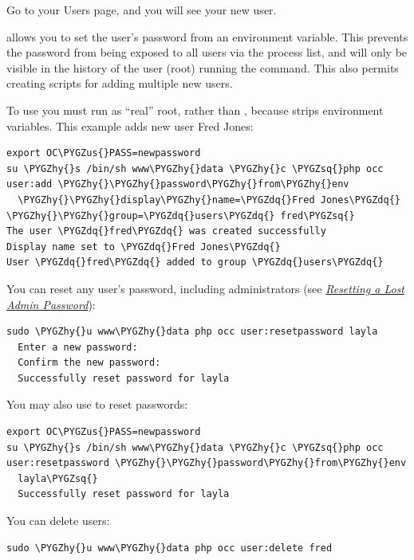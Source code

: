 \documentclass[letterpaper,10pt,english]{sphinxmanual}
\def\PYGZus{\char`\_}
\def\PYGZhy{\char`\-}
\def\PYGZsq{\char`\'}
\def\PYGZdq{\char`\"}
\begin{document}
Go to your Users page, and you will see your new user.

 allows you to set the user's password from an environment
variable. This prevents the password from being exposed to all users via the
process list, and will only be visible in the history of the user (root)
running the command. This also permits creating scripts for adding multiple new
users.

To use  you must run as ``real'' root, rather than ,
because  strips environment variables. This example adds new user Fred
Jones:

\begin{Verbatim}[commandchars=\\\{\}]
export OC\PYGZus{}PASS=newpassword
su \PYGZhy{}s /bin/sh www\PYGZhy{}data \PYGZhy{}c \PYGZsq{}php occ user:add \PYGZhy{}\PYGZhy{}password\PYGZhy{}from\PYGZhy{}env
  \PYGZhy{}\PYGZhy{}display\PYGZhy{}name=\PYGZdq{}Fred Jones\PYGZdq{} \PYGZhy{}\PYGZhy{}group=\PYGZdq{}users\PYGZdq{} fred\PYGZsq{}
The user \PYGZdq{}fred\PYGZdq{} was created successfully
Display name set to \PYGZdq{}Fred Jones\PYGZdq{}
User \PYGZdq{}fred\PYGZdq{} added to group \PYGZdq{}users\PYGZdq{}
\end{Verbatim}

You can reset any user's password, including administrators (see
{\hyperref[configuration_user/reset_admin_password::doc]{\emph{Resetting a Lost Admin Password}}}):

\begin{Verbatim}[commandchars=\\\{\}]
sudo \PYGZhy{}u www\PYGZhy{}data php occ user:resetpassword layla
  Enter a new password:
  Confirm the new password:
  Successfully reset password for layla
\end{Verbatim}

You may also use  to reset passwords:

\begin{Verbatim}[commandchars=\\\{\}]
export OC\PYGZus{}PASS=newpassword
su \PYGZhy{}s /bin/sh www\PYGZhy{}data \PYGZhy{}c \PYGZsq{}php occ user:resetpassword \PYGZhy{}\PYGZhy{}password\PYGZhy{}from\PYGZhy{}env
  layla\PYGZsq{}
  Successfully reset password for layla
\end{Verbatim}

You can delete users:

\begin{Verbatim}[commandchars=\\\{\}]
sudo \PYGZhy{}u www\PYGZhy{}data php occ user:delete fred
\end{Verbatim}
\end{document}
